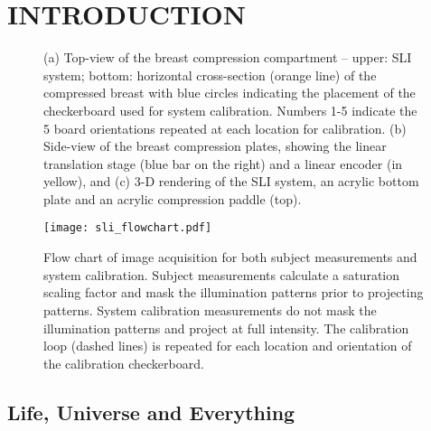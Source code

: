 
\chapter{INTRODUCTION} %
\label{chap:intro}


\begin{figure}
	\begin{center}
	\end{center}
	\caption{ (a) Top-view of the breast compression compartment -- upper: SLI system; bottom: horizontal cross-section (orange line) of the compressed breast with blue circles indicating the placement of the checkerboard used for system calibration. Numbers 1-5 indicate the 5 board orientations repeated at each location for calibration. (b) Side-view of the breast compression plates, showing the linear translation stage (blue bar on the right) and a linear encoder (in yellow), and  (c) 3-D rendering of the SLI system, an acrylic bottom plate and an acrylic compression paddle (top). } 
	\label{fig:mammographysetup}
\end{figure} 


\begin{figure}
    \begin{center}
    \texttt{[image: sli\_flowchart.pdf]}
    \end{center}
    \caption{Flow chart of image acquisition for both subject measurements and system calibration. Subject measurements calculate a saturation scaling factor and mask the illumination patterns prior to projecting patterns. System calibration measurements do not mask the illumination patterns and project at full intensity. The calibration loop (dashed lines) is repeated for each location and orientation of the calibration checkerboard.} 
    \label{fig:sli_flowchart}
\end{figure} 



\section{Life, Universe and Everything}
\label{chap:intro:design}






